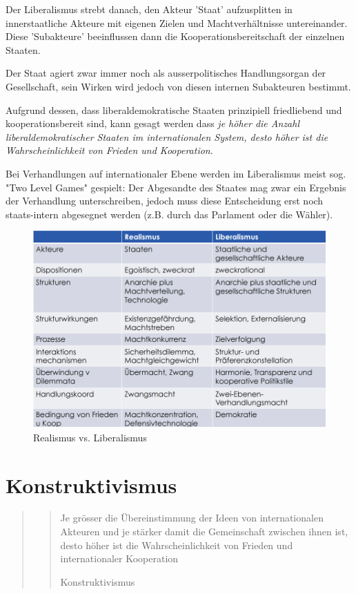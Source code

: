 \documentclass[a4paper, 11pt]{article}
\begin{document}
\noindent Der Liberalismus strebt danach, den Akteur 'Staat' aufzusplitten in innerstaatliche Akteure mit eigenen Zielen und Machtverhältnisse untereinander. Diese 'Subakteure' beeinflussen dann die Kooperationsbereitschaft der einzelnen Staaten. 

Der Staat agiert zwar immer noch als ausserpolitisches Handlungsorgan der Gesellschaft, sein Wirken wird jedoch von diesen internen Subakteuren bestimmt.

Aufgrund dessen, dass liberaldemokratische Staaten prinzipiell friedliebend und kooperationsbereit sind, kann gesagt werden dass \textit{je höher die Anzahl liberaldemokratischer Staaten im internationalen System, desto höher ist die Wahrscheinlichkeit von Frieden und Kooperation}.

\vspace{10px}

\noindent Bei Verhandlungen auf internationaler Ebene werden im Liberalismus meist sog. "Two Level Games" gespielt: Der Abgesandte des Staates mag zwar ein Ergebnis der Verhandlung unterschreiben, jedoch muss diese Entscheidung erst noch staats-intern abgesegnet werden (z.B. durch das Parlament oder die Wähler).

\begin{figure}[htb]
	\centering
	\includegraphics[keepaspectratio=true,height=20\baselineskip]{RealismusVsLiberalismus.png}
	\caption{Realismus vs. Liberalismus}
	\label{fig:realismusvsliberalismus}
\end{figure}

\section{Konstruktivismus}
\begin{quote}
	\blockquote[Konstruktivismus]{Je grösser die Übereinstimmung der Ideen von internationalen Akteuren und je stärker damit die Gemeinschaft zwischen ihnen ist, desto höher ist die Wahrscheinlichkeit von Frieden und internationaler Kooperation}
\end{quote}
\end{document}
